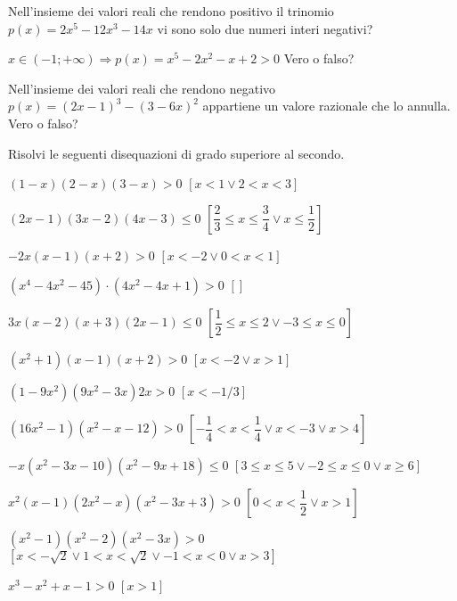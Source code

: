 \begin{esercizio}
\label{ese:4.35}
Nell'insieme dei valori reali che rendono positivo il trinomio 
\(p(x)=2x^5-12x^3-14x\) vi sono solo due numeri interi negativi?
\end{esercizio}

\begin{esercizio}
 \label{ese:4.36}
\(x\in (-1;+\infty )\Rightarrow p(x)=x^5-2x^2-x+2>0\) Vero o falso?
\end{esercizio}

\begin{esercizio}
\label{ese:4.37}
Nell'insieme dei valori reali che rendono negativo \(p(x)=(2x-1)^3-(3-6x)^2\) 
appartiene un valore razionale che lo annulla. Vero o falso?
\end{esercizio}

\begin{esercizio}[\Ast]
\label{ese:4.38}
Risolvi le seguenti disequazioni di grado superiore al secondo.
\begin{enumeratea}
\item \((1-x)(2-x)(3-x)>0\) \hfill \(\left[x<1\vee 2<x<3\right]\)
\item \((2x-1)(3x-2)(4x-3)\le 0\) 
 \hfill \(\left[\dfrac 2 3\le x\le \dfrac 3 4 \vee x\le \dfrac 1 2\right]\)
\item \(-2x(x-1)(x+2)>0\) \hfill \(\left[x<-2\vee 0<x<1\right]\)
\item \( \left(x^4-4x^2-45\right)\cdot \left(4x^2-4x+1\right)>0 \) 
 \hfill \(\left[\right]\)
\item \(3x(x-2)(x+3)(2x-1)\le 0\) 
 \hfill \(\left[\dfrac 1 2\le x\le 2\vee -3\le x\le 0\right]\)
\item \(\left(x^2+1\right)(x-1)(x+2)>0\) \hfill \(\left[x<-2\vee x>1\right]\)
\item \(\left(1-9x^2\right)\left(9x^2-3x\right)2x>0\) 
 \hfill \(\left[x<-1/3\right]\)
\item \(\left(16x^2-1\right)\left(x^2-x-12\right)>0\) 
 \hfill \(\left[-\dfrac 1 4<x<\dfrac 1 4\vee x<-3\vee x>4\right]\)
\item \(-x\left(x^2-3x-10\right)\left(x^2-9x+18\right)\le 0\)
 \hfill \(\left[3\le x\le 5\vee -2\le x\le 0\vee x\ge 6\right]\)
\item \(x^2(x-1)\left(2x^2-x\right)\left(x^2-3x+3\right)>0\)
 \hfill \(\left[0<x<\dfrac 1 2\vee x>1\right]\)
\item \(\left(x^2-1\right)\left(x^2-2\right)\left(x^2-3x\right)>0\)
 \hfill \(\left[x<-\sqrt 2\vee 1<x<\sqrt 2\vee -1<x<0\vee x>3\right]\)
\item \(x^3-x^2+x-1>0\) \hfill \(\left[x>1\right]\)

\end{enumeratea}
\end{esercizio}
